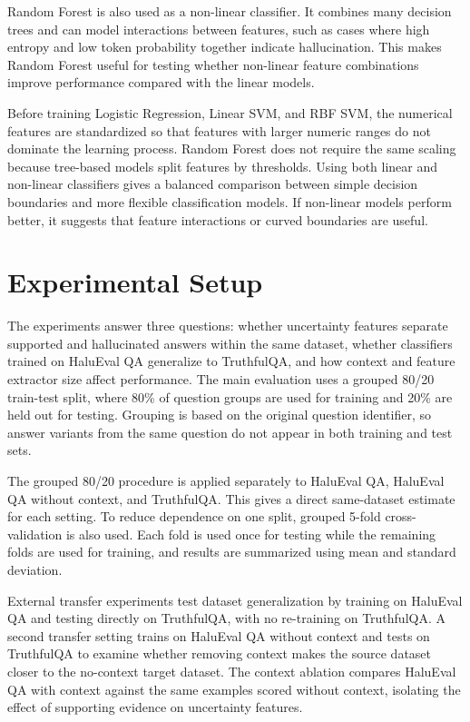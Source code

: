 \documentclass[11pt]{article}
\begin{document}
Random Forest is also used as a non-linear classifier. It combines many decision trees and can model interactions between features, such as cases where high entropy and low token probability together indicate hallucination. This makes Random Forest useful for testing whether non-linear feature combinations improve performance compared with the linear models.

Before training Logistic Regression, Linear SVM, and RBF SVM, the numerical features are standardized so that features with larger numeric ranges do not dominate the learning process. Random Forest does not require the same scaling because tree-based models split features by thresholds. Using both linear and non-linear classifiers gives a balanced comparison between simple decision boundaries and more flexible classification models. If non-linear models perform better, it suggests that feature interactions or curved boundaries are useful.

\newpage

\section{Experimental Setup}
The experiments answer three questions: whether uncertainty features separate supported and hallucinated answers within the same dataset, whether classifiers trained on HaluEval QA generalize to TruthfulQA, and how context and feature extractor size affect performance. The main evaluation uses a grouped 80/20 train-test split, where 80\% of question groups are used for training and 20\% are held out for testing. Grouping is based on the original question identifier, so answer variants from the same question do not appear in both training and test sets.

The grouped 80/20 procedure is applied separately to HaluEval QA, HaluEval QA without context, and TruthfulQA. This gives a direct same-dataset estimate for each setting. To reduce dependence on one split, grouped 5-fold cross-validation is also used. Each fold is used once for testing while the remaining folds are used for training, and results are summarized using mean and standard deviation.

External transfer experiments test dataset generalization by training on HaluEval QA and testing directly on TruthfulQA, with no re-training on TruthfulQA. A second transfer setting trains on HaluEval QA without context and tests on TruthfulQA to examine whether removing context makes the source dataset closer to the no-context target dataset. The context ablation compares HaluEval QA with context against the same examples scored without context, isolating the effect of supporting evidence on uncertainty features.
\end{document}
